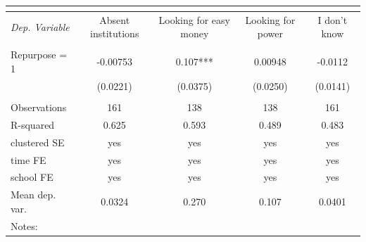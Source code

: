 \documentclass[12pt]{article}
\theoremstyle{plain}
\theoremstyle{plain}
\theoremstyle{plain}
\theoremstyle{definition}
\theoremstyle{plain}
\theoremstyle{definition}
\theoremstyle{plain}
\theoremstyle{remark}
\theoremstyle{definition}
\theoremstyle{definition}
\theoremstyle{plain}
\begin{document}
\begin{table}[H]
{\begin{tabular}{p{7.39em}llll}
   	\midrule
   	\multicolumn{1}{r}{} &       &       &       &  \\
   	\midrule
   	\multicolumn{1}{l}{\textit{Dep. Variable}} & \multicolumn{1}{c}{Absent institutions} & \multicolumn{1}{c}{Looking for easy money} & \multicolumn{1}{c}{Looking for power} & \multicolumn{1}{c}{I don't know} \\
   	\multicolumn{1}{r}{} & \multicolumn{1}{c}{} & \multicolumn{1}{c}{} & \multicolumn{1}{c}{} & \multicolumn{1}{c}{} \\
   	\multicolumn{1}{l}{Repurpose = 1} & \multicolumn{1}{c}{-0.00753} & \multicolumn{1}{c}{0.107***} & \multicolumn{1}{c}{0.00948} & \multicolumn{1}{c}{-0.0112} \\
   	\multicolumn{1}{l}{} & \multicolumn{1}{c}{(0.0221)} & \multicolumn{1}{c}{(0.0375)} & \multicolumn{1}{c}{(0.0250)} & \multicolumn{1}{c}{(0.0141)} \\
   	\multicolumn{1}{l}{} & \multicolumn{1}{c}{} & \multicolumn{1}{c}{} & \multicolumn{1}{c}{} & \multicolumn{1}{c}{} \\
   	\multicolumn{1}{l}{Observations} & \multicolumn{1}{c}{161} & \multicolumn{1}{c}{138} & \multicolumn{1}{c}{138} & \multicolumn{1}{c}{161} \\
   	\multicolumn{1}{l}{R-squared} & \multicolumn{1}{c}{0.625} & \multicolumn{1}{c}{0.593} & \multicolumn{1}{c}{0.489} & \multicolumn{1}{c}{0.483} \\
   	\multicolumn{1}{l}{clustered SE} & \multicolumn{1}{c}{yes} & \multicolumn{1}{c}{yes} & \multicolumn{1}{c}{yes} & \multicolumn{1}{c}{yes} \\
   	\multicolumn{1}{l}{time FE} & \multicolumn{1}{c}{yes} & \multicolumn{1}{c}{yes} & \multicolumn{1}{c}{yes} & \multicolumn{1}{c}{yes} \\
   	\multicolumn{1}{l}{school FE} & \multicolumn{1}{c}{yes} & \multicolumn{1}{c}{yes} & \multicolumn{1}{c}{yes} & \multicolumn{1}{c}{yes} \\
   	\multicolumn{1}{l}{Mean dep. var.} & \multicolumn{1}{c}{0.0324} & \multicolumn{1}{c}{0.270} & \multicolumn{1}{c}{0.107} & \multicolumn{1}{c}{0.0401} \\
   	\midrule
   	Notes: &       &       &       &  \\
   \end{tabular}%
}
\end{table}
\end{document}
